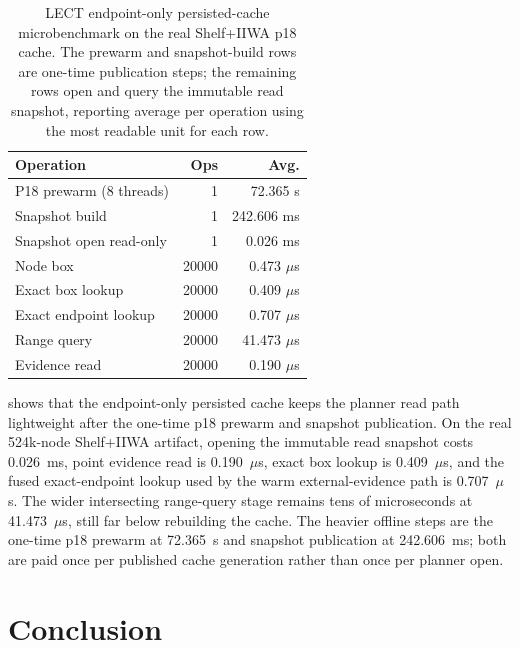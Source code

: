 \documentclass[journal]{IEEEtran}
\begin{document}
\begin{table}[t]
  \caption{LECT endpoint-only persisted-cache microbenchmark on the real
  Shelf+IIWA p18 cache. The prewarm and snapshot-build rows are one-time
  publication steps; the remaining rows open and query the immutable read
  snapshot, reporting average per operation using the most readable unit for
  each row.}
  \label{tab:exp3_lect_disk_microbench}
  \centering
  \begin{tabular}{@{}lrr@{}}
    \toprule
    Operation & Ops & Avg. \\
    \midrule
    P18 prewarm (8 threads) & 1 & 72.365 s \\
    Snapshot build & 1 & 242.606 ms \\
    Snapshot open read-only & 1 & 0.026 ms \\
    Node box & 20000 & 0.473 $\mu$s \\
    Exact box lookup & 20000 & 0.409 $\mu$s \\
    Exact endpoint lookup & 20000 & 0.707 $\mu$s \\
    Range query & 20000 & 41.473 $\mu$s \\
    Evidence read & 20000 & 0.190 $\mu$s \\
    \bottomrule
  \end{tabular}
\end{table}

 shows that the endpoint-only persisted
cache keeps the planner read path lightweight after the one-time p18 prewarm and
snapshot publication. On the real 524k-node Shelf+IIWA artifact, opening the
immutable read snapshot costs 0.026~ms, point evidence read is
0.190~$\mu$s, exact box lookup is 0.409~$\mu$s, and the fused exact-endpoint
lookup used by the warm external-evidence path is 0.707~$\mu$s. The wider
intersecting range-query stage remains tens of microseconds at
41.473~$\mu$s, still far below rebuilding the cache. The heavier offline steps
are the one-time p18 prewarm at 72.365~s and snapshot publication at
242.606~ms; both are paid once per published cache generation rather than once
per planner open.

\section{Conclusion}\label{sec:conclusion}
\end{document}
